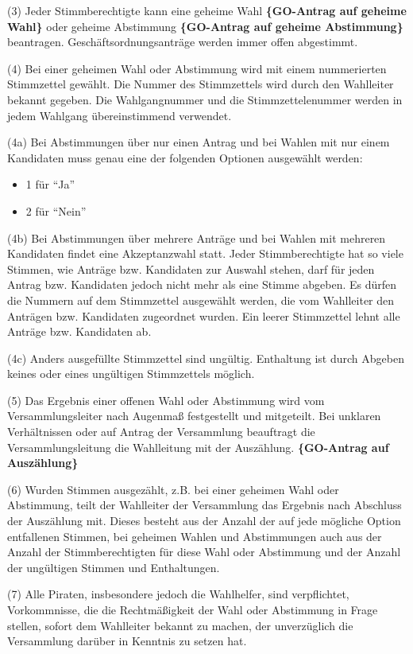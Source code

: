 (3) Jeder Stimmberechtigte kann eine geheime Wahl \textbf{\{GO-Antrag
auf geheime Wahl\}} oder geheime Abstimmung \textbf{\{GO-Antrag auf
geheime Abstimmung\}} beantragen. Geschäftsordnungsanträge werden immer
offen abgestimmt.

(4) Bei einer geheimen Wahl oder Abstimmung wird mit einem nummerierten
Stimmzettel gewählt. Die Nummer des Stimmzettels wird durch den
Wahlleiter bekannt gegeben. Die Wahlgangnummer und die
Stimmzettelenummer werden in jedem Wahlgang übereinstimmend verwendet.

(4a) Bei Abstimmungen über nur einen Antrag und bei Wahlen mit nur einem
Kandidaten muss genau eine der folgenden Optionen ausgewählt werden:

\begin{itemize}
\item
  1 für ``Ja''
\item
  2 für ``Nein''
\end{itemize}
(4b) Bei Abstimmungen über mehrere Anträge und bei Wahlen mit mehreren
Kandidaten findet eine Akzeptanzwahl statt. Jeder Stimmberechtigte hat
so viele Stimmen, wie Anträge bzw. Kandidaten zur Auswahl stehen, darf
für jeden Antrag bzw. Kandidaten jedoch nicht mehr als eine Stimme
abgeben. Es dürfen die Nummern auf dem Stimmzettel ausgewählt werden,
die vom Wahlleiter den Anträgen bzw. Kandidaten zugeordnet wurden. Ein
leerer Stimmzettel lehnt alle Anträge bzw. Kandidaten ab.

(4c) Anders ausgefüllte Stimmzettel sind ungültig. Enthaltung ist durch
Abgeben keines oder eines ungültigen Stimmzettels möglich.

(5) Das Ergebnis einer offenen Wahl oder Abstimmung wird vom
Versammlungsleiter nach Augenmaß festgestellt und mitgeteilt. Bei
unklaren Verhältnissen oder auf Antrag der Versammlung beauftragt die
Versammlungsleitung die Wahlleitung mit der Auszählung.
\textbf{\{GO-Antrag auf Auszählung\}}

(6) Wurden Stimmen ausgezählt, z.B. bei einer geheimen Wahl oder
Abstimmung, teilt der Wahlleiter der Versammlung das Ergebnis nach
Abschluss der Auszählung mit. Dieses besteht aus der Anzahl der auf jede
mögliche Option entfallenen Stimmen, bei geheimen Wahlen und
Abstimmungen auch aus der Anzahl der Stimmberechtigten für diese Wahl
oder Abstimmung und der Anzahl der ungültigen Stimmen und Enthaltungen.

(7) Alle Piraten, insbesondere jedoch die Wahlhelfer, sind verpflichtet,
Vorkommnisse, die die Rechtmäßigkeit der Wahl oder Abstimmung in Frage
stellen, sofort dem Wahlleiter bekannt zu machen, der unverzüglich die
Versammlung darüber in Kenntnis zu setzen hat.

